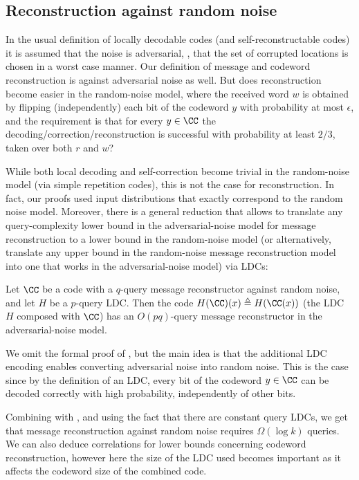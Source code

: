 \subsection{Reconstruction against random noise}\label{sec:conclusion:rnd}
In the usual definition of locally decodable codes (and self-reconstructable codes) it is assumed that the noise is adversarial, \ie, that the
 set of corrupted locations is chosen in a worst case manner. Our definition of message and codeword
reconstruction is against adversarial noise as well. But does reconstruction become easier in the random-noise model, where the received word $w$ is obtained by flipping (independently) each bit of the codeword $y$ with probability at most $\epsilon$, and the requirement is that for every $y \in \CC$ the decoding/correction/reconstruction is successful with probability at least $2/3$, taken over both $r$ and $w$?

While both local decoding and 
%
self-correction become trivial in the random-noise model (via simple repetition codes), this is not the case for reconstruction. In fact, our proofs used input distributions that exactly correspond to the random noise model. Moreover, there is a general reduction that allows to translate any query-complexity lower bound in the adversarial-noise model for message reconstruction to a lower bound in the random-noise model (or alternatively, translate any upper bound in the random-noise message reconstruction model into one that works in the adversarial-noise model) via LDCs:

\begin{claim}\label{lem:randomnoise} Let $\CC$ be a code with a $q$-query message reconstructor against random noise, and let $H$ be a $p$-query LDC\@. Then the code $H(\CC)(x) \triangleq H(\CC(x))$ (the LDC $H$ composed with $\CC$) has an $O(pq)$-query message reconstructor in the adversarial-noise model.
\end{claim}

We omit the formal proof of , but the main idea is that the additional LDC encoding enables converting adversarial noise into random noise. This is the case since by the definition of an LDC, every bit of the codeword $y \in \CC$ can be decoded correctly with high probability, independently of other bits.

Combining  with , and using the fact that there are constant query LDCs, we
get that message reconstruction against random noise requires $\Omega(\log k)$ queries. We can also deduce correlations for lower bounds concerning codeword reconstruction, however here the size of the LDC used becomes important as it affects the codeword size of the combined code.
%


